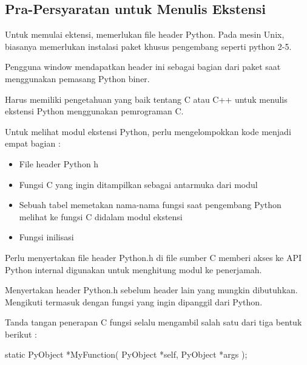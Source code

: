 \documentclass{wileySix}
\begin{document}
\begin{myEnumerate}
{\begin{myEnumerate}
\section{Pra-Persyaratan untuk Menulis Ekstensi}
 \par
\noindent 
\hspace*{0.5in} Untuk memulai ektensi, memerlukan file header Python. Pada mesin Unix, biasanya memerlukan instalasi paket khusus pengembang seperti python 2-5. \par
\noindent 
\hspace*{0.5in} Pengguna window mendapatkan header ini sebagai bagian dari paket saat menggunakan pemasang Python biner. \par
\noindent 
\hspace*{0.5in} Harus memiliki pengetahuan yang baik tentang C atau C++ untuk menulis ekstensi Python menggunakan pemrograman C. \par
\noindent 
\hspace*{0.5in} Untuk melihat modul ekstensi Python, perlu mengelompokkan kode menjadi empat bagian : \par
\noindent 
\begin{itemize}
	\item File header Python h \par
	\noindent 
	\item Fungsi C yang ingin ditampilkan sebagai antarmuka dari modul \par
	\noindent 
	\item Sebuah tabel memetakan nama-nama fungsi saat pengembang Python melihat ke fungsi C didalam modul ekstensi \par
	\noindent 
	\item Fungsi inilisasi\end{itemize}
\par
\vspace{12pt}
Perlu menyertakan file header Python.h di file sumber C memberi akses ke API Python internal digunakan untuk menghitung modul ke penerjamah. \par
Menyertakan header Python.h sebelum header lain yang mungkin dibutuhkan. Mengikuti termasuk dengan fungsi yang ingin dipanggil dari Python. \par
Tanda tangan penerapan C fungsi selalu mengambil salah satu dari tiga bentuk berikut : \par
\noindent 
{\fontsize{10pt}{10pt}\selectfont static PyObject *MyFunction( PyObject *self, PyObject *args );} \par
\noindent 

\end{myEnumerate}}
\end{myEnumerate}
\end{document}
